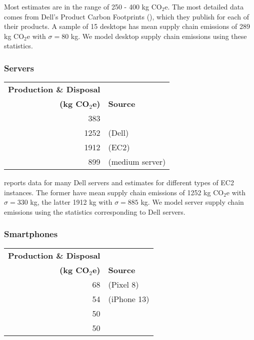 \documentclass[11pt]{article}
\newcommand{\assumption}[1]{{#1}}
\begin{document}
Most estimates are in the range of 250 - 400 kg CO$_2$e. The most detailed data comes from
Dell's Product Carbon Footprints (\cite{dellpcf}), which they publish for each of their products.
A sample of 15 desktops has mean supply chain emissions of 289 kg CO$_2$e with $\sigma = 80$ kg.
\assumption{We model desktop supply chain emissions using these statistics.}

\subsubsection{Servers}

\begin{center}
\begin{tabular}{|r|l|}
\hline
\textbf{Production \& Disposal} & \\
\textbf{(kg CO$_2$e)} & \textbf{Source} \\ \hline
383 & \textcite{teehan2013} \\ \hline
1252 & \textcite{davy2021} (Dell) \\ \hline
1912 & \textcite{davy2021} (EC2) \\ \hline
899 & \textcite{boavizta} (medium server)\\ \hline
\end{tabular}
\label{tab:embodied_emissions:servers}
\end{center}

\textcite{davy2021} reports data for many Dell servers and estimates for different types of EC2 instances.
The former have mean supply chain emissions of 1252 kg CO$_2$e with $\sigma = 330$ kg, the latter
1912 kg with $\sigma = 885$ kg.
\assumption{We model server supply chain emissions using the statistics corresponding to Dell servers.}

\subsubsection{Smartphones}

\begin{center}
\begin{tabular}{|r|l|}
\hline
\textbf{Production \& Disposal} & \\
\textbf{(kg CO$_2$e)} & \textbf{Source} \\ \hline
68 & \textcite{googlepixel8} (Pixel 8)\\ \hline
54 & \textcite{appleiphone13} (iPhone 13)\\ \hline
50 & \textcite{unctadder2024} \\ \hline
50 & \textcite{lovehagen2023} \\ \hline
\end{tabular}
\label{tab:embodied_emissions:phones}
\end{center}
\end{document}
